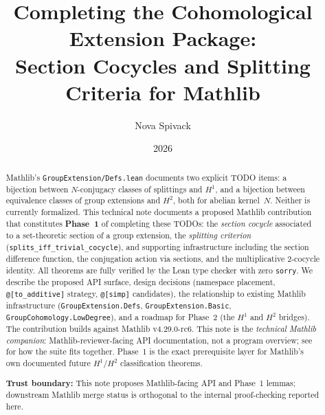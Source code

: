 \documentclass[11pt]{article}
\title{Completing the Cohomological Extension Package:\\[0.35em]
\large Section Cocycles and Splitting Criteria for Mathlib}
\author{Nova Spivack}
\date{2026}
\begin{document}
\maketitle
\NovaZenodoAfterTitle


\begin{abstract}
\raggedright
Mathlib's \texttt{GroupExtension/Defs.lean} documents two explicit TODO items:
a bijection between $N$-conjugacy classes of splittings and $H^1$, and a bijection
between equivalence classes of group extensions and $H^2$, both for abelian kernel~$N$.
Neither is currently formalized. This technical note documents a proposed Mathlib
contribution that constitutes \textbf{Phase~1} of completing these TODOs: the
\emph{section cocycle} associated to a set-theoretic section of a group extension,
the \emph{splitting criterion} (\texttt{splits\_iff\_trivial\_cocycle}), and supporting
infrastructure including the section difference function, the conjugation action via
sections, and the multiplicative 2-cocycle identity. All theorems are fully verified
by the Lean type checker with zero \texttt{sorry}. We describe the proposed API surface,
design decisions (namespace placement,
\texttt{@[to\_additive]} strategy, \texttt{@[simp]} candidates), the relationship to
existing Mathlib infrastructure (\texttt{GroupExtension.Defs},
\texttt{GroupExtension.Basic}, \texttt{GroupCohomology.LowDegree}), and a roadmap for
Phase~2 (the $H^1$ and $H^2$ bridges). The contribution builds against Mathlib
v4.29.0-rc6. This note is the \emph{technical Mathlib companion}: Mathlib-reviewer-facing
API documentation, not a program overview; see~\cite{SpivackSynthesis} for how the suite
fits together. Phase~1 is the exact prerequisite layer for Mathlib's own documented future
$H^1$/$H^2$ classification theorems.

\textbf{Trust boundary:} This note proposes Mathlib-facing API and Phase~1 lemmas; downstream Mathlib merge status is orthogonal to the internal proof-checking reported here.
\end{abstract}


\end{document}
